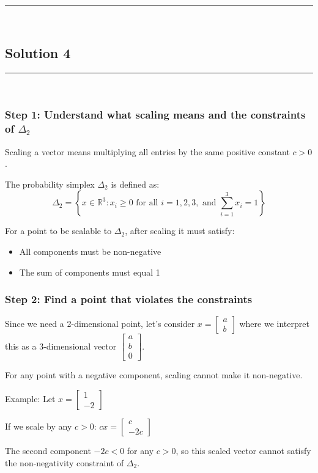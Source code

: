 \documentclass{article}
\begin{document}
\noindent\rule{\textwidth}{0.4pt}\\

\newpage

\subsection*{Solution 4}
\noindent\rule{\textwidth}{0.4pt}\\

\subsubsection*{Step 1: Understand what scaling means and the constraints of $\Delta_2$}
\parbox{\textwidth}{
Scaling a vector means multiplying all entries by the same positive constant $c > 0$.

The probability simplex $\Delta_2$ is defined as:
$$\Delta_2 = \left\{x \in \mathbb{R}^3 : x_i \geq 0 \text{ for all } i = 1,2,3, \text{ and } \sum_{i=1}^{3} x_i = 1\right\}$$

For a point to be scalable to $\Delta_2$, after scaling it must satisfy:
\begin{itemize}
\item All components must be non-negative
\item The sum of components must equal 1
\end{itemize}
}

\subsubsection*{Step 2: Find a point that violates the constraints}
\parbox{\textwidth}{
Since we need a 2-dimensional point, let's consider $x = \begin{bmatrix} a \\ b \end{bmatrix}$ where we interpret this as a 3-dimensional vector $\begin{bmatrix} a \\ b \\ 0 \end{bmatrix}$.

For any point with a negative component, scaling cannot make it non-negative. 

Example: Let $x = \begin{bmatrix} 1 \\ -2 \end{bmatrix}$

If we scale by any $c > 0$: $cx = \begin{bmatrix} c \\ -2c \end{bmatrix}$

The second component $-2c < 0$ for any $c > 0$, so this scaled vector cannot satisfy the non-negativity constraint of $\Delta_2$.
}
\end{document}
